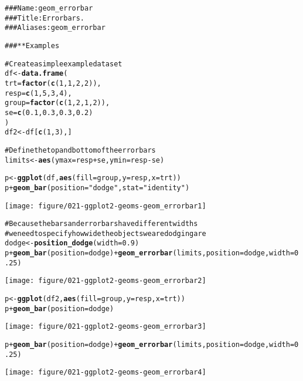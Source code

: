 \documentclass[a4paper,titlepage]{tufte-handout}\usepackage{graphicx, color}
\makeatletter
\def\maxwidth{ %
  \ifdim\Gin@nat@width>\linewidth
    \linewidth
  \else
    \Gin@nat@width
  \fi
}
\newcommand{\hlfunctioncall}[1]{\textcolor[rgb]{0.501960784313725,0,0.329411764705882}{\textbf{#1}}}%
\newcommand{\hlstring}[1]{\textcolor[rgb]{0.6,0.6,1}{#1}}%
\newcommand{\hlcomment}[1]{\textcolor[rgb]{0.180392156862745,0.6,0.341176470588235}{#1}}%
\newenvironment{kframe}{%
 \def\at@end@of@kframe{}%
 \ifinner\ifhmode%
  \def\at@end@of@kframe{\end{minipage}}%
  \begin{minipage}{\columnwidth}%
 \fi\fi%
 \def\FrameCommand##1{\hskip\@totalleftmargin \hskip-\fboxsep
 \colorbox{shadecolor}{##1}\hskip-\fboxsep
     \hskip-\linewidth \hskip-\@totalleftmargin \hskip\columnwidth}%
 \MakeFramed {\advance\hsize-\width
   \@totalleftmargin\z@ \linewidth\hsize
   \@setminipage}}%
 {\par\unskip\endMakeFramed%
 \at@end@of@kframe}
\newenvironment{knitrout}{}{} %
\makeatother
\begin{document}
\begin{knitrout}
\color{fgcolor}\begin{kframe}
\begin{alltt}
\hlcomment{### Name: geom_errorbar}
\hlcomment{### Title: Error bars.}
\hlcomment{### Aliases: geom_errorbar}

\hlcomment{### ** Examples}

\hlcomment{# Create a simple example dataset}
df <- \hlfunctioncall{data.frame}(
  trt = \hlfunctioncall{factor}(\hlfunctioncall{c}(1, 1, 2, 2)),
  resp = \hlfunctioncall{c}(1, 5, 3, 4),
  group = \hlfunctioncall{factor}(\hlfunctioncall{c}(1, 2, 1, 2)),
  se = \hlfunctioncall{c}(0.1, 0.3, 0.3, 0.2)
)
df2 <- df[\hlfunctioncall{c}(1,3),]

\hlcomment{# Define the top and bottom of the errorbars}
limits <- \hlfunctioncall{aes}(ymax = resp + se, ymin=resp - se)

p <- \hlfunctioncall{ggplot}(df, \hlfunctioncall{aes}(fill=group, y=resp, x=trt))
p + \hlfunctioncall{geom_bar}(position=\hlstring{"dodge"}, stat=\hlstring{"identity"})
\end{alltt}
\end{kframe}
\texttt{[image: figure/021-ggplot2-geoms-geom\_errorbar1]} 
\begin{kframe}\begin{alltt}

\hlcomment{# Because the bars and errorbars have different widths}
\hlcomment{# we need to specify how wide the objects we are dodging are}
dodge <- \hlfunctioncall{position_dodge}(width=0.9)
p + \hlfunctioncall{geom_bar}(position=dodge) + \hlfunctioncall{geom_errorbar}(limits, position=dodge, width=0.25)
\end{alltt}
\end{kframe}
\texttt{[image: figure/021-ggplot2-geoms-geom\_errorbar2]} 
\begin{kframe}\begin{alltt}

p <- \hlfunctioncall{ggplot}(df2, \hlfunctioncall{aes}(fill=group, y=resp, x=trt))
p + \hlfunctioncall{geom_bar}(position=dodge)
\end{alltt}
\end{kframe}
\texttt{[image: figure/021-ggplot2-geoms-geom\_errorbar3]} 
\begin{kframe}\begin{alltt}
p + \hlfunctioncall{geom_bar}(position=dodge) + \hlfunctioncall{geom_errorbar}(limits, position=dodge, width=0.25)
\end{alltt}
\end{kframe}
\texttt{[image: figure/021-ggplot2-geoms-geom\_errorbar4]} 
\begin{kframe}\begin{alltt}


\end{alltt}
\end{kframe}
\end{knitrout}
\end{document}
